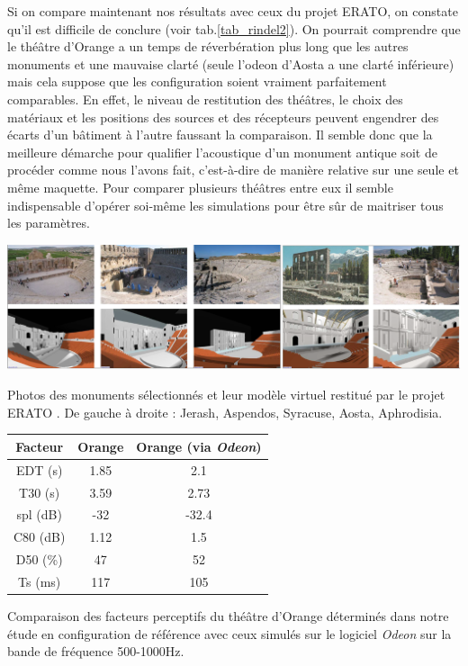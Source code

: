 Si on compare maintenant nos résultats avec ceux du projet ERATO, on constate qu'il est difficile de conclure (voir tab.\ref{tab_rindel2}). On pourrait comprendre que le théâtre d'Orange a un temps de réverbération plus long que les autres monuments et une mauvaise clarté (seule l'\gls{odeon} d'Aosta a une clarté inférieure) mais cela suppose que les configuration soient vraiment parfaitement comparables. En effet, le niveau de restitution des théâtres, le choix des matériaux et les positions des sources et des récepteurs peuvent engendrer des écarts d'un bâtiment à l'autre faussant la comparaison. Il semble donc que la meilleure démarche pour qualifier l'acoustique d'un monument antique soit de procéder comme nous l'avons fait, c'est-à-dire de manière relative sur une seule et même maquette. Pour comparer plusieurs théâtres entre eux il semble indispensable d'opérer soi-même les simulations pour être sûr de maitriser tous les paramètres. 
%
\begin{figureth}
	\includegraphics[width=\linewidth]{images/rindel}
	\caption[Photos des monuments sélectionnés et leur modèle virtuel restitué par le projet ERATO.]{Photos des monuments sélectionnés et leur modèle virtuel restitué par le projet ERATO \footnotemark. De gauche à droite : Jerash, Aspendos, Syracuse, Aosta, Aphrodisia.}
	\label{rindel}
\end{figureth}
%
\begin{tableth}
 \begin{tabular}{| *{3}{c|}} 
 \hline 
 Facteur & Orange & Orange (via \textit{Odeon})   \\ 
 \hline 
 \hline 
  \gls{EDT} (s)& 1.85& 2.1 \\ 
 \hline 
\gls{T30} (s)& 3.59&  2.73\\ 
 \hline 
\gls{spl} (dB) &-32 & -32.4\\ 
 \hline 
\gls{C80} (dB)& 1.12&1.5  \\ 
 \hline 
\gls{D50} (\%)&47 & 52 \\ 
 \hline 
\gls{Ts} (ms)&117 & 105 \\ 
 \hline 
\end{tabular} 
 \caption{Comparaison des facteurs perceptifs du théâtre d'Orange déterminés dans notre étude en configuration de référence avec ceux simulés sur le logiciel \textit{Odeon} sur la bande de fréquence 500-1000Hz.}
 \label{tab_rindel} 
 \end{tableth}
 
